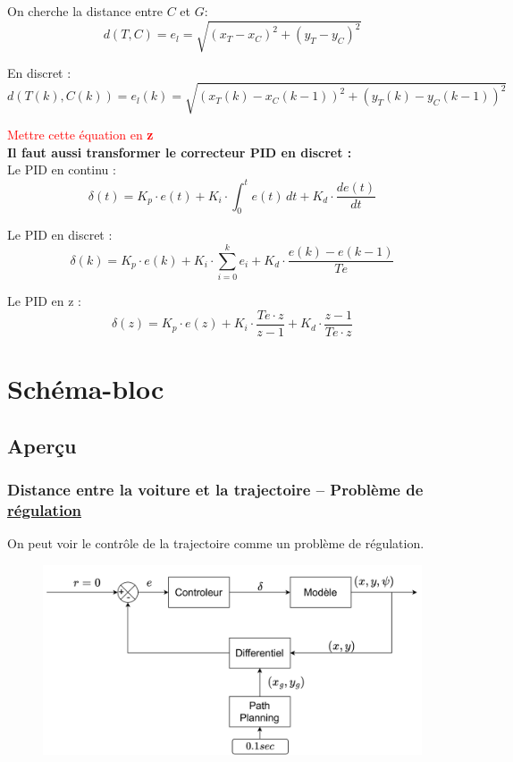 \documentclass[a4paper,12pt]{extarticle}
\begin{document}
On cherche la distance entre $C$ et $G$:
\begin{equation*}
    d(T, C) = e_l= \sqrt{(x_T-x_C)^2+(y_T-y_C)^2}
\end{equation*}

En discret : 
\begin{equation*}
\boxed{
    d(T(k), C(k)) = e_l(k) = \sqrt{(x_T(k)-x_C(k-1))^2+(y_T(k)-y_C(k-1))^2}
}
\end{equation*}

\textcolor{red}{Mettre cette équation en \Large\textbf{z}}\\

\textbf{Il faut aussi transformer le correcteur PID en discret :} \\
Le PID en continu : 
\begin{equation*}
   \delta(t) = K_p \cdot e(t) + K_i \cdot \int_{0}^{t} e(t) \,dt + K_d \cdot \frac{de(t)}{dt}
\end{equation*}

Le PID en discret :
\begin{equation*}
    \delta(k) = K_p \cdot e(k) + K_i \cdot \sum_{i=0}^{k} e_i + K_d \cdot \frac{e(k)-e(k-1)}{Te}
\end{equation*}

Le PID en z : 
\begin{equation*}
    \delta(z) = K_p \cdot e(z) + K_i \cdot \frac{Te\cdot z}{z-1} + K_d \cdot \frac{z-1}{Te \cdot z}
\end{equation*}

\section{Schéma-bloc}
\subsection{Aperçu}
\subsubsection{Distance entre la voiture et la trajectoire – Problème de \underline{régulation}}
On peut voir le contrôle  de la trajectoire comme un problème de régulation.

\begin{figure}[h!]
    \centering
    \includegraphics[width=1\textwidth]{image/regulation.png}\\
\end{figure}
\end{document}
